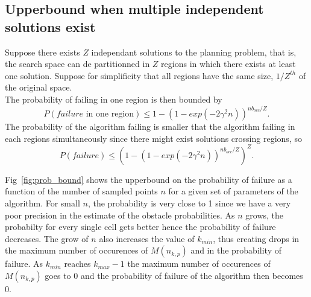 \documentclass[letterpaper, 10 pt, conference]{ieeeconf}
\theoremstyle{definition}
\begin{document}
\subsection{Upperbound when multiple independent solutions exist}
Suppose there exists $Z$ independant solutions to the planning problem, that is, the search space can de partitionned in $Z$ regions in which there exists at least one solution. Suppose for simplificity that all regions have the same size, $1/Z^{th}$ of the original space.\\
The probability of failing in one region is then bounded by 
\begin{equation}
P(failure\text{ in one region}) \leq 1-\left(1-exp(-2\gamma^2 n)\right)^{nb_{occ}/Z}.
\end{equation}
The probability of the algorithm failing is smaller that the algorithm failing in each regions simultaneously since there might exist solutions crossing regions, so
\begin{equation}
P(failure) \leq \left( 1-\left(1-exp(-2\gamma^2 n)\right)^{nb_{occ}/Z}\right)^Z.
\end{equation}


Fig~\ref{fig:prob_bound} shows the upperbound on the probability of failure as a function of the number of sampled points $n$ for a given set of parameters of the algorithm. For small $n$, the probability is very close to 1 since we have a very poor precision in the estimate of the obstacle probabilities. As $n$ grows, the probabilty for every single cell gets better hence the probability of failure decreases. The grow of $n$ also increases the value of $k_{min}$, thus creating drops in the maximum number of occurences of $M\left( n_{k,p} \right)$ and in the probability of failure. As $k_{min}$ reaches $k_{max}-1$ the maximum number of occurences of $M\left( n_{k,p} \right)$ goes to 0 and the probability of failure of the algorithm then becomes 0.
\end{document}
